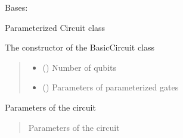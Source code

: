 \documentclass[letterpaper,10pt,english]{sphinxmanual}
\begin{document}
\begin{fulllineitems}
\label{\detokenize{qcompute_qapp.circuit:qcompute_qapp.circuit.ParameterizedCircuit}}
\pysigstartsignatures
{}
\pysigstopsignatures
\sphinxAtStartPar
Bases: {\hyperref[\detokenize{qcompute_qapp.circuit:qcompute_qapp.circuit.BasicCircuit}]{}}

\sphinxAtStartPar
Parameterized Circuit class

\sphinxAtStartPar
The constructor of the BasicCircuit class
\begin{quote}\begin{description}
\begin{itemize}
\item {} 
\sphinxAtStartPar
{} () \textendash{} Number of qubits

\item {} 
\sphinxAtStartPar
{} () \textendash{} Parameters of parameterized gates

\end{itemize}

\end{description}\end{quote}

\begin{fulllineitems}
\label{\detokenize{qcompute_qapp.circuit:qcompute_qapp.circuit.ParameterizedCircuit.parameters}}
\pysigstartsignatures
{}
\pysigstopsignatures
\sphinxAtStartPar
Parameters of the circuit
\begin{quote}\begin{description}
\sphinxAtStartPar
Parameters of the circuit


\end{description}
\end{quote}
\end{fulllineitems}
\end{fulllineitems}
\end{document}
